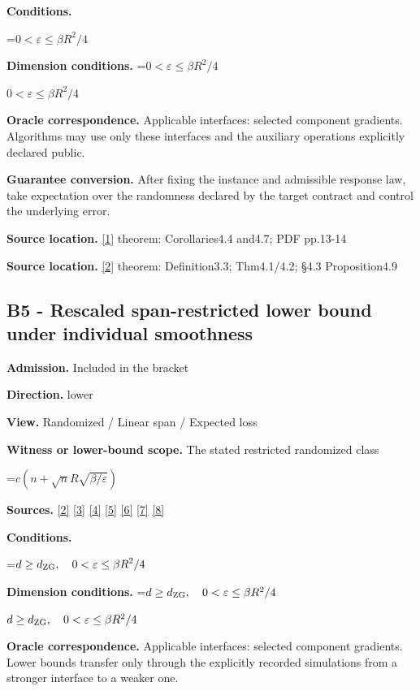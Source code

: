 \documentclass[10pt,a4paper]{article}
\newcommand{\AtlasMath}[1]{\par\begingroup\centering\setbox0=\hbox{$\displaystyle #1$}\ifdim\wd0>1.4\linewidth\typeout{ATLAS WIDE FORMULA: \the\wd0}\fi\ifdim\wd0>\linewidth\resizebox{\linewidth}{!}{\box0}\else\box0\fi\par\endgroup}
\newcommand{\AtlasInlineMath}[1]{\begingroup\setbox0=\hbox{$#1$}\ifdim\wd0>.4\linewidth\endgroup\AtlasMath{#1}\else\endgroup$#1$\fi}
\begin{document}
\textbf{Conditions.} 
\AtlasMath{0<\varepsilon\le\beta R^2/4}


\textbf{Dimension conditions.} \AtlasInlineMath{0<\varepsilon\le\beta R^2/4}

\textbf{Oracle correspondence.} Applicable interfaces: selected component gradients. Algorithms may use only these interfaces and the auxiliary operations explicitly declared public.

\textbf{Guarantee conversion.} After fixing the instance and admissible response law, take expectation over the randomness declared by the target contract and control the underlying error.

\textbf{Source location.} \href{https://arxiv.org/pdf/1802.03866}{[1]} theorem: Corollaries4.4 and4.7; PDF pp.13-14

\textbf{Source location.} \href{https://proceedings.mlr.press/v97/zhou19b/zhou19b.pdf}{[2]} theorem: Definition3.3; Thm4.1/4.2; §4.3 Proposition4.9

\subsection{B5 - Rescaled span-restricted lower bound under individual smoothness}
\textbf{Admission.} Included in the bracket

\textbf{Direction.} lower

\textbf{View.} Randomized / Linear span / Expected loss

\textbf{Witness or lower-bound scope.} The stated restricted randomized class

\AtlasMath{c(n+\sqrt n R\sqrt{\beta/\varepsilon})}
\textbf{Sources.} \href{https://proceedings.mlr.press/v97/zhou19b/zhou19b.pdf}{[2]} \href{https://arxiv.org/pdf/1405.4980}{[3]} \href{https://arxiv.org/pdf/2101.09740v2}{[4]} \href{https://arxiv.org/pdf/2609.33360v2}{[5]} \href{https://arxiv.org/pdf/2609.10874}{[6]} \href{https://www2.isye.gatech.edu/~nemirovs/MOR_AccuracyCertificates.pdf}{[7]} \href{https://arxiv.org/pdf/2609.20701}{[8]}

\textbf{Conditions.} 
\AtlasMath{d\ge d_{\rm ZG},\quad0<\varepsilon\le\beta R^2/4}


\textbf{Dimension conditions.} \AtlasInlineMath{d\ge d_{\rm ZG},\quad0<\varepsilon\le\beta R^2/4}

\textbf{Oracle correspondence.} Applicable interfaces: selected component gradients. Lower bounds transfer only through the explicitly recorded simulations from a stronger interface to a weaker one.
\end{document}
